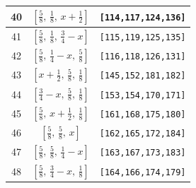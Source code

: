 \documentclass[fleqn,8pt]{jsarticle}
\begin{document}
\begin{longtable}{ccc}
40 & $\left[ \frac{5}{8},\, \frac{1}{8},\, x + \frac{1}{2} \right]$ & {\tt [114,117,124,136]} \\ \hline
41 & $\left[ \frac{5}{8},\, \frac{1}{8},\, \frac{3}{4} - x \right]$ & {\tt [115,119,125,135]} \\ \hline
42 & $\left[ \frac{5}{8},\, \frac{1}{4} - x,\, \frac{5}{8} \right]$ & {\tt [116,118,126,131]} \\ \hline
43 & $\left[ x + \frac{1}{2},\, \frac{5}{8},\, \frac{1}{8} \right]$ & {\tt [145,152,181,182]} \\ \hline
44 & $\left[ \frac{3}{4} - x,\, \frac{5}{8},\, \frac{1}{8} \right]$ & {\tt [153,154,170,171]} \\ \hline
45 & $\left[ \frac{5}{8},\, x + \frac{1}{2},\, \frac{1}{8} \right]$ & {\tt [161,168,175,180]} \\ \hline
46 & $\left[ \frac{5}{8},\, \frac{5}{8},\, x \right]$ & {\tt [162,165,172,184]} \\ \hline
47 & $\left[ \frac{5}{8},\, \frac{5}{8},\, \frac{1}{4} - x \right]$ & {\tt [163,167,173,183]} \\ \hline
48 & $\left[ \frac{5}{8},\, \frac{3}{4} - x,\, \frac{1}{8} \right]$ & {\tt [164,166,174,179]} \\
\end{longtable}
\renewcommand{\arraystretch}{1.2}
\end{document}
